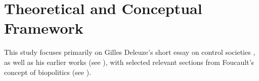 %
%






\section{Theoretical and Conceptual Framework}
This study focuses primarily on Gilles Deleuze's short essay on
control societies \parencite[]{deleuze1992a}, as well as his earlier works (see
\cite{deleuze1983, deleuze1987}), with selected relevant sections from
Foucault's concept of biopolitics (see \cite{foucault2008a, foucault1988}).

